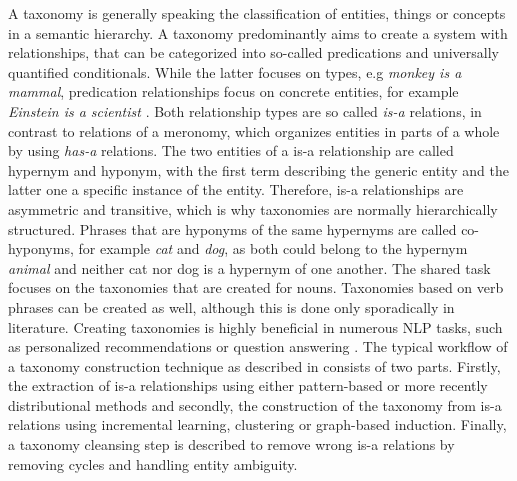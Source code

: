 \documentclass[12pt, headsepline, a4paper]{scrartcl}
\begin{document}
A taxonomy is generally speaking the classification of entities, things or concepts in a semantic hierarchy. A taxonomy predominantly aims to create a system with relationships, that can be categorized into so-called predications and universally quantified conditionals. While the latter focuses on types, e.g \emph{monkey is a mammal}, predication relationships focus on concrete entities, for example \emph{Einstein is a scientist} \citep{DBLP:journals/computer/Brachman83}. Both relationship types are so called \emph{is-a} relations, in contrast to relations of a meronomy, which organizes entities in parts of a whole by using \emph{has-a} relations. The two entities of a is-a relationship are called hypernym and hyponym, with the first term describing the generic entity and the latter one a specific instance of the entity. Therefore, is-a relationships are asymmetric and transitive, which is why taxonomies are normally hierarchically structured. Phrases that are hyponyms of the same hypernyms are called co-hyponyms, for example \emph{cat} and \emph{dog}, as both could belong to the hypernym \emph{animal} and neither cat nor dog is a hypernym of one another. The shared task focuses on the taxonomies that are created for nouns. Taxonomies based on verb phrases can be created as well, although this is done only sporadically in literature.
Creating taxonomies is highly beneficial in numerous NLP tasks, such as personalized recommendations \cite{zhang2014taxonomy} or question answering \citep{Yang2017technical}.
The typical workflow of a taxonomy construction technique as described in \cite{wang2017short} consists of two parts. Firstly, the extraction of is-a relationships using either pattern-based or more recently distributional methods and secondly, the construction of the taxonomy from is-a relations using incremental learning, clustering or graph-based induction. Finally, a taxonomy cleansing step is described to remove wrong is-a relations by removing cycles and handling entity ambiguity.
\end{document}
